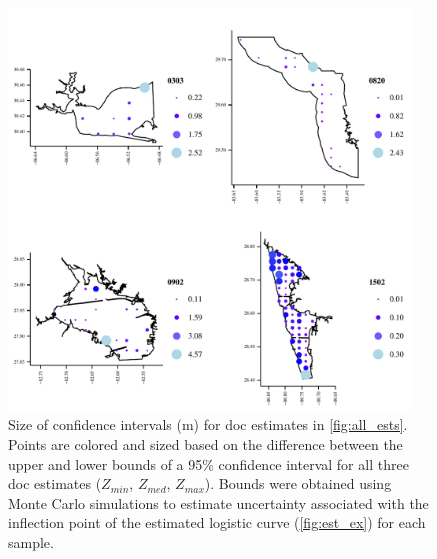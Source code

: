 \documentclass[letterpaper,12pt,oneside]{article}\usepackage[]{graphicx}\usepackage[]{color}
\begin{document}
\begin{figure}
\centering
\includegraphics[width = 0.95\textwidth]{figs/all_sens.pdf}
\caption{Size of confidence intervals (m) for \acl{doc} estimates in \cref{fig:all_ests}.  Points are colored and sized based on the difference between the upper and lower bounds of a 95\% confidence interval for all three \ac{doc} estimates ($Z_{min}$, $Z_{med}$, $Z_{max}$). Bounds were obtained using Monte Carlo simulations to estimate uncertainty associated with the inflection point of the estimated logistic curve (\cref{fig:est_ex}) for each sample.}
\label{fig:all_sens}
\end{figure}

\end{document}

